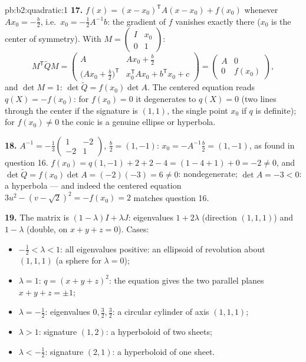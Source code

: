 \begin{solution}{pb:b2:quadratic:1}
\textbf{17.} $f(x) = (x - x_0)^{\mathsf T}A(x - x_0) + f(x_0)$
whenever $Ax_0 = -\frac b2$, i.e.\ $x_0 = -\frac12A^{-1}b$: the
gradient of $f$ vanishes exactly there ($x_0$ is the center of
symmetry). With $M = \begin{pmatrix} I & x_0\\ 0 &
1\end{pmatrix}$:
\[
M^{\mathsf T}\widetilde QM
= \begin{pmatrix}
A & Ax_0 + \frac b2\\[2pt]
\bigl(Ax_0 + \frac b2\bigr)^{\mathsf T} &
x_0^{\mathsf T}Ax_0 + b^{\mathsf T}x_0 + c
\end{pmatrix}
= \begin{pmatrix} A & 0\\ 0 & f(x_0)\end{pmatrix},
\]
and $\det M = 1$: $\det\widetilde Q = f(x_0)\det A$. The
centered equation reads $q(X) = -f(x_0)$: for $f(x_0) = 0$ it
degenerates to $q(X) = 0$ (two lines through the center if the
signature is $(1,1)$, the single point $x_0$ if $q$ is
definite); for $f(x_0) \neq 0$ the conic is a genuine ellipse
or hyperbola.

\textbf{18.} $A^{-1} = -\frac13\begin{pmatrix} 1 & -2\\ -2 &
1\end{pmatrix}$, $\frac b2 = (1, -1)$: $x_0 =
-A^{-1}\frac b2 = (1, -1)$, as found in question 16. $f(x_0) =
q(1,-1) + 2 + 2 - 4 = (1 - 4 + 1) + 0 = -2 \neq 0$, and
$\det\widetilde Q = f(x_0)\det A = (-2)(-3) = 6 \neq 0$:
nondegenerate; $\det A = -3 < 0$: a hyperbola --- and indeed
the centered equation $3u^2 - (v - \sqrt2)^2 = -f(x_0) = 2$
matches question 16.

\textbf{19.} The matrix is $(1-\lambda)I + \lambda J$:
eigenvalues $1 + 2\lambda$ (direction $(1,1,1)$) and $1 -
\lambda$ (double, on $x + y + z = 0$). Cases:
\begin{itemize}
  \item $-\frac12 < \lambda < 1$: all eigenvalues positive:
        an ellipsoid of revolution about $(1,1,1)$ (a sphere
        for $\lambda = 0$);
  \item $\lambda = 1$: $q = (x+y+z)^2$: the equation gives the
        two parallel planes $x + y + z = \pm1$;
  \item $\lambda = -\frac12$: eigenvalues $0, \frac32,
        \frac32$: a circular cylinder of axis $(1,1,1)$;
  \item $\lambda > 1$: signature $(1, 2)$: a hyperboloid of
        two sheets;
  \item $\lambda < -\frac12$: signature $(2, 1)$: a
        hyperboloid of one sheet.
\end{itemize}


\end{solution}
